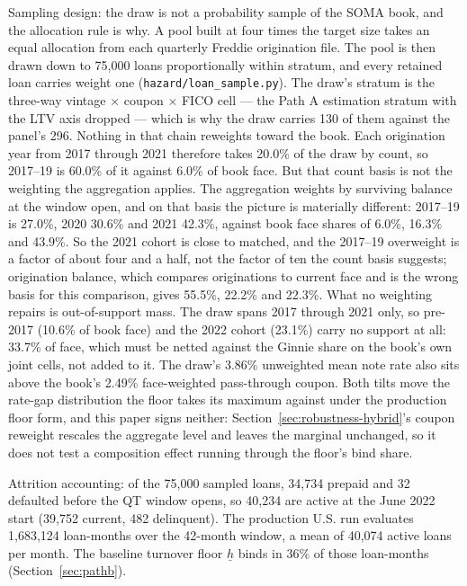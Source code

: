 \documentclass[12pt]{article}
\begin{document}
Sampling design: the draw is not a probability sample of the SOMA book, and the allocation rule is why. A pool built at four times the target size takes an equal allocation from each quarterly Freddie origination file. The pool is then drawn down to 75,000 loans proportionally within stratum, and every retained loan carries weight one (\texttt{hazard/loan\_sample.py}). The draw's stratum is the three-way vintage $\times$ coupon $\times$ FICO cell --- the Path A estimation stratum with the LTV axis dropped --- which is why the draw carries 130 of them against the panel's 296. Nothing in that chain reweights toward the book. Each origination year from 2017 through 2021 therefore takes 20.0\% of the draw by count, so 2017--19 is 60.0\% of it against 6.0\% of book face. But that count basis is not the weighting the aggregation applies. The aggregation weights by surviving balance at the window open, and on that basis the picture is materially different: 2017--19 is 27.0\%, 2020 30.6\% and 2021 42.3\%, against book face shares of 6.0\%, 16.3\% and 43.9\%. So the 2021 cohort is close to matched, and the 2017--19 overweight is a factor of about four and a half, not the factor of ten the count basis suggests; origination balance, which compares originations to current face and is the wrong basis for this comparison, gives 55.5\%, 22.2\% and 22.3\%. What no weighting repairs is out-of-support mass. The draw spans 2017 through 2021 only, so pre-2017 (10.6\% of book face) and the 2022 cohort (23.1\%) carry no support at all: 33.7\% of face, which must be netted against the Ginnie share on the book's own joint cells, not added to it. The draw's 3.86\% unweighted mean note rate also sits above the book's 2.49\% face-weighted pass-through coupon. Both tilts move the rate-gap distribution the floor takes its maximum against under the production floor form, and this paper signs neither: Section~\ref{sec:robustness-hybrid}'s coupon reweight rescales the aggregate level and leaves the marginal unchanged, so it does not test a composition effect running through the floor's bind share.

Attrition accounting: of the 75,000 sampled loans, 34,734 prepaid and 32 defaulted before the QT window opens, so 40,234 are active at the June 2022 start (39,752 current, 482 delinquent). The production U.S. run evaluates 1,683,124 loan-months over the 42-month window, a mean of 40,074 active loans per month. The baseline turnover floor $\underline{h}$ binds in 36\% of those loan-months (Section~\ref{sec:pathb}).
\end{document}
